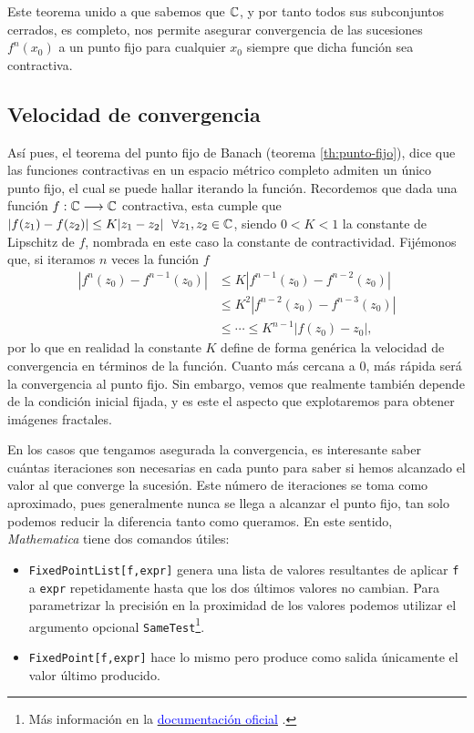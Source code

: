 Este teorema unido a que sabemos que $\mathbb{C}$, y por tanto todos sus subconjuntos cerrados, es completo, nos permite asegurar convergencia de las sucesiones $f^n(x_0)$ a un punto fijo para cualquier $x_0$ siempre que dicha función sea contractiva.

\subsection{Velocidad de convergencia}

Así pues, el teorema del punto fijo de Banach (teorema \ref{th:punto-fijo}), dice que las funciones contractivas en un espacio métrico completo admiten un único punto fijo, el cual se puede hallar iterando la función. Recordemos que dada una función $f:\mathbb{C}\longrightarrow\mathbb{C}$ contractiva, esta cumple que $|f(z_1)-f(z_2)|\leq K|z_1-z_2|\ \ \forall z_1,z_2\in\C$, siendo $0<K<1$ la constante de Lipschitz de $f$, nombrada en este caso la constante de contractividad. Fijémonos que, si iteramos $n$ veces la función $f$
\begin{equation*}
  \begin{split}
    |f^n(z_0)-f^{n-1}(z_0)| & \leq K|f^{n-1}(z_0)-f^{n-2}(z_0)| \\
    & \leq K^2 |f^{n-2}(z_0)-f^{n-3}(z_0)| \\
    & \leq\cdots\leq K^{n-1}|f(z_0)-z_0|,
  \end{split}
\end{equation*}
por lo que en realidad la constante $K$ define de forma genérica la velocidad de convergencia en términos de la función. Cuanto más cercana a $0$, más rápida será la convergencia al punto fijo. Sin embargo, vemos que realmente también depende de la condición inicial fijada, y es este el aspecto que explotaremos para obtener imágenes fractales. 

En los casos que tengamos asegurada la convergencia, es interesante saber cuántas iteraciones son necesarias en cada punto para saber si hemos alcanzado el valor al que converge la sucesión. Este número de iteraciones se toma como aproximado, pues generalmente nunca se llega a alcanzar el punto fijo, tan solo podemos reducir la diferencia tanto como queramos. En este sentido, \textit{Mathematica} tiene dos comandos útiles:

\begin{itemize}
    \item \verb|FixedPointList[f,expr]| genera una lista de valores resultantes de aplicar \verb|f| a \verb|expr| repetidamente hasta que los dos últimos valores no cambian. Para parametrizar la precisión en la proximidad de los valores podemos utilizar el argumento opcional \verb|SameTest|\footnote{Más información en la \href{https://reference.wolfram.com/language/ref/FixedPointList.html}{\textcolor{blue}{documentación oficial}} .}.
    \item \verb|FixedPoint[f,expr]| hace lo mismo pero produce como salida únicamente el valor último producido.
\end{itemize}

